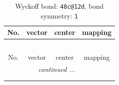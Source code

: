 \documentclass[fleqn,8pt]{jsarticle}
\begin{document}
\renewcommand{\arraystretch}{1.2}
\begin{longtable}{cccc}
\caption{Wyckoff bond: {\tt 48c@12d}, bond symmetry: {\tt 1}}
 \\
 \hline \hline
No. & vector & center & mapping \\ \hline \endfirsthead

\multicolumn{3}{l}{\tablename\ \thetable{}} \\
 \hline \hline
No. & vector & center & mapping \\ \hline \endhead

 \hline \hline
\multicolumn{3}{r}{\footnotesize\it continued ...} \\ \endfoot

 \hline \hline
\multicolumn{3}{r}{} \\ \endlastfoot


\end{longtable}
\end{document}

